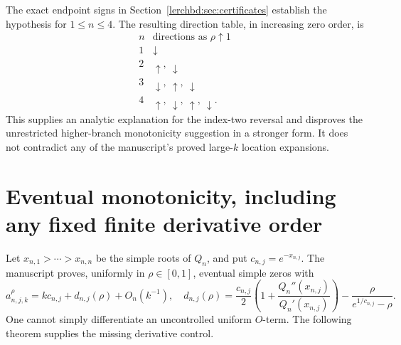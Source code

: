 The exact endpoint signs in Section~\ref{lerchbd:sec:certificates} establish the hypothesis for $1\le n\le4$. The resulting direction table, in increasing zero order, is
\[
\begin{array}{c|c}
 n&\text{directions as }\rho\uparrow1\\\hline
 1&\downarrow\\
 2&\uparrow,\ \downarrow\\
 3&\downarrow,\ \uparrow,\ \downarrow\\
 4&\uparrow,\ \downarrow,\ \uparrow,\ \downarrow.
\end{array}
\]
This supplies an analytic explanation for the index-two reversal and disproves the unrestricted higher-branch monotonicity suggestion in a stronger form. It does not contradict any of the manuscript's proved large-$k$ location expansions.

\section{Eventual monotonicity, including any fixed finite derivative order}\label{lerchbd:sec:eventual}
Let $x_{n,1}>\cdots>x_{n,n}$ be the simple roots of $Q_n$, and put
$c_{n,j}=e^{-x_{n,j}}$. The manuscript proves, uniformly in $\rho\in[0,1]$, eventual simple zeros with
\begin{equation}\label{lerchbd:eq:existing-offset}
 a_{n,j,k}^{\rho}=kc_{n,j}+d_{n,j}(\rho)+O_n(k^{-1}),
\quad
 d_{n,j}(\rho)=\frac{c_{n,j}}2
 \left(1+\frac{Q_n''(x_{n,j})}{Q_n'(x_{n,j})}\right)
 -\frac{\rho}{e^{1/c_{n,j}}-\rho}.
\end{equation}
One cannot simply differentiate an uncontrolled uniform $O$-term. The following theorem supplies the missing derivative control.

